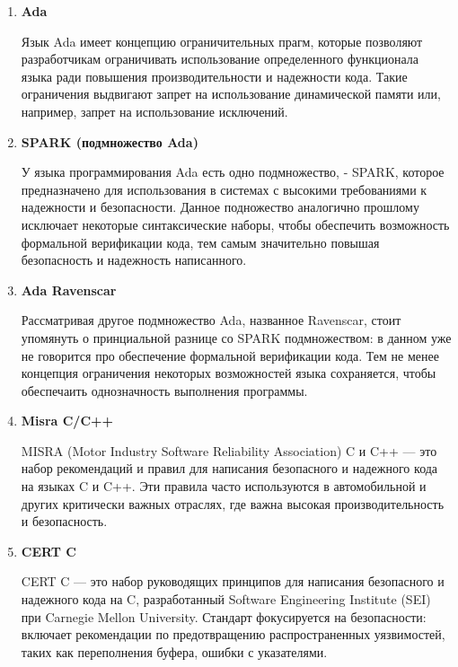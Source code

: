 \documentclass{mipt-thesis-bs}
\begin{document}
\begin{enumerate}
        \item \textbf{Ada}

        Язык Ada имеет концепцию ограничительных прагм, которые позволяют разработчикам ограничивать
        использование определенного функционала языка ради повышения производительности и надежности
        кода. Такие ограничения выдвигают запрет на использование динамической памяти или, например,
        запрет на использование исключений.

        \item \textbf{SPARK (подмножество Ada)}

        У языка программирования Ada есть одно подмножество, - SPARK, которое предназначено для
        использования в системах с высокими требованиями к надежности и безопасности. Данное
        подножество аналогично прошлому исключает некоторые синтаксические наборы, чтобы
        обеспечить возможность формальной верификации кода, тем самым значительно повышая
        безопасность и надежность написанного.

        \item \textbf{Ada Ravenscar}

        Рассматривая другое подмножество Ada, названное Ravenscar, стоит упомянуть о принциальной
        разнице со SPARK подмножеством: в данном уже не говорится про обеспечение формальной верификации
        кода. Тем не менее концепция ограничения некоторых возможностей языка сохраняется, чтобы
        обеспечаить однозначность выполнения программы.

        \item \textbf{Misra C/C++}

        MISRA (Motor Industry Software Reliability Association) C и C++ — это набор
        рекомендаций и правил для написания безопасного и надежного кода на
        языках C и C++. Эти правила часто используются в автомобильной и
        других критически важных отраслях, где важна высокая производительность и безопасность.

        \item \textbf{CERT C}

        CERT C — это набор руководящих принципов для написания безопасного и надежного 
        кода на C, разработанный Software Engineering Institute (SEI) при Carnegie Mellon University.
        Стандарт фокусируется на безопасности: включает рекомендации по предотвращению
        распространенных уязвимостей, таких как переполнения буфера, ошибки с указателями.


\end{enumerate}
\end{document}
